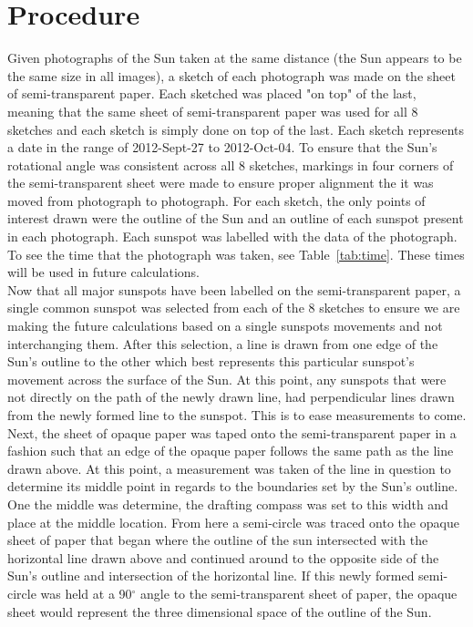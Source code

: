 \documentclass{article}
\begin{document}
\section{Procedure}

Given photographs of the Sun taken at the same distance (the Sun appears to be the same size in all images), a sketch of each
photograph was made on the sheet of semi-transparent paper. Each sketched was placed "on top" of the last, meaning that
the same sheet of semi-transparent paper was used for all 8 sketches and each sketch is simply done on top of the last.
Each sketch represents a date in the range of 2012-Sept-27 to 2012-Oct-04.  To
ensure that the Sun's rotational angle was consistent across all 8 sketches, markings in four corners of the semi-transparent
sheet were made to ensure proper alignment the it was moved from photograph to photograph. For each sketch, the only 
points of interest drawn were the outline of the Sun and an outline of each sunspot present in each photograph. Each sunspot
was labelled with the data of the photograph. To see the time that the photograph was taken, see Table~\ref{tab:time}.
These times will be used in future calculations.\\

Now that all major sunspots have been labelled on the semi-transparent paper, a single common sunspot was selected from
each of the 8 sketches to ensure we are making the future calculations based on a single sunspots movements and not
interchanging them. After this selection, a line is drawn from one edge of the Sun's outline to the other which best represents
this particular sunspot's movement across the surface of the Sun. At this point, any sunspots that were not directly on the
path of the newly drawn line, had perpendicular lines drawn from the newly formed line to the sunspot. This is to ease
measurements to come.\\

Next, the sheet of opaque paper was taped onto the semi-transparent paper in a fashion such that an edge of the opaque
paper follows the same path as the line drawn above. At this point, a measurement was taken of the line in question to 
determine its middle point in regards to the boundaries set by the Sun's outline. One the middle was determine, the 
drafting compass was set to this width and place at the middle location. From here a semi-circle was traced onto the 
opaque sheet of paper that began where the outline of the sun intersected with the horizontal line drawn above and
continued around to the opposite side of the Sun's outline and intersection of the horizontal line. If this newly formed
semi-circle was held at a 90$^\circ$ angle to the semi-transparent sheet of paper, the opaque sheet would represent
the three dimensional space of the outline of the Sun.\\
\end{document}

